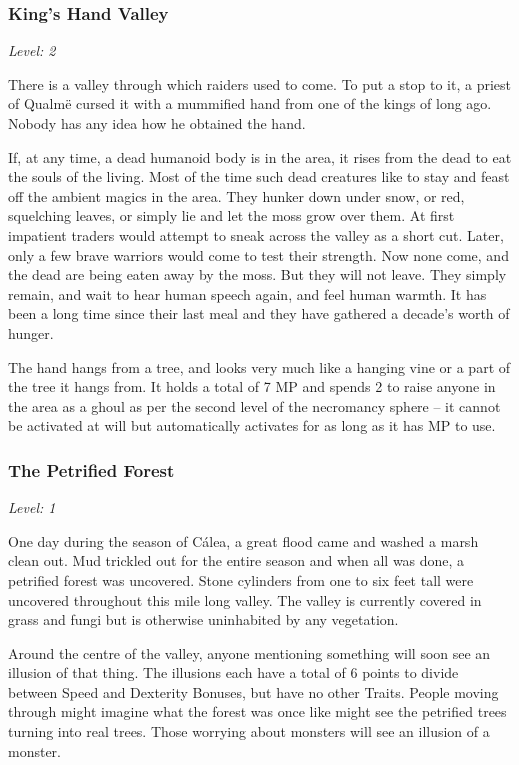 \subsubsection{King's Hand Valley}

\textit{Level: 2}

There is a valley through which raiders used to come.  To put a stop to it, a priest of Qualm\"{e} cursed it with a mummified hand from one of the kings of long ago.  Nobody has any idea how he obtained the hand.

If, at any time, a dead humanoid body is in the area, it rises from the dead to eat the souls of the living.  Most of the time such dead creatures like to stay and feast off the ambient magics in the area.  They hunker down under snow, or red, squelching leaves, or simply lie and let the moss grow over them.   At first impatient traders would attempt to sneak across the valley as a short cut.  Later, only a few brave warriors would come to test their strength.  Now none come, and the dead are being eaten away by the moss.  But they will not leave.  They simply remain, and wait to hear human speech again, and feel human warmth.  It has been a long time since their last meal and they have gathered a decade's worth of hunger.

The hand hangs from a tree, and looks very much like a hanging vine or a part of the tree it hangs from.  It holds a total of 7 MP and spends 2 to raise anyone in the area as a ghoul as per the second level of the necromancy sphere -- it cannot be activated at will but automatically activates for as long as it has MP to use.

\subsubsection{The Petrified Forest}

\textit{Level: 1}

One day during the season of C\'{a}lea, a great flood came and washed a marsh clean out.  Mud trickled out for the entire season and when all was done, a petrified forest was uncovered.  Stone cylinders from one to six feet tall were uncovered throughout this mile long valley.  The valley is currently covered in grass and fungi but is otherwise uninhabited by any vegetation.

Around the centre of the valley, anyone mentioning something will soon see an illusion of that thing.  The illusions each have a total of 6 points to divide between Speed and Dexterity Bonuses, but have no other Traits.  People moving through might imagine what the forest was once like might see the petrified trees turning into real trees.  Those worrying about monsters will see an illusion of a monster.

